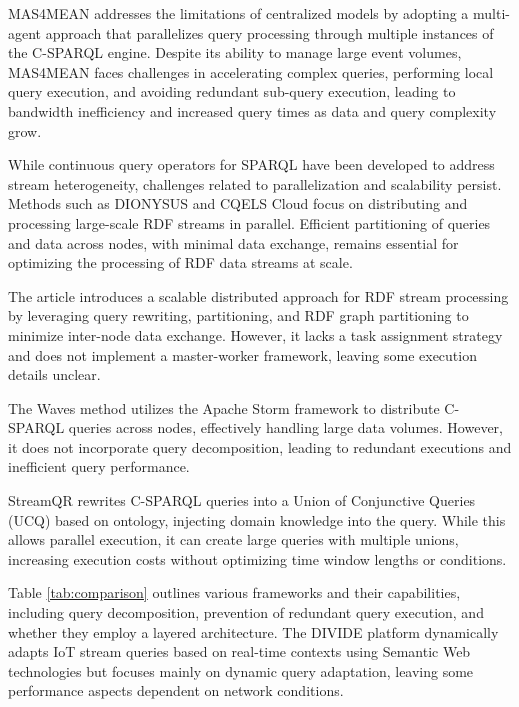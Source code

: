 \documentclass[5p,times]{elsarticle}
\begin{document}
MAS4MEAN \cite{mebrek2020stream} addresses the limitations of centralized models by adopting a multi-agent approach that parallelizes query processing 
through multiple instances of the C-SPARQL engine.
Despite its ability to manage large event volumes,
   MAS4MEAN faces challenges in accelerating complex queries, performing local query execution,
    and avoiding redundant sub-query execution, leading to bandwidth inefficiency and increased query times as data and query complexity grow.

While continuous query operators for SPARQL 
have been developed to address stream heterogeneity, challenges related to parallelization and scalability persist.
 Methods such as DIONYSUS \cite{gillani2016dionysus} and CQELS Cloud \cite{le2013elastic} focus on distributing and processing large-scale RDF
  streams in parallel. Efficient partitioning of queries and data across nodes, with minimal data exchange, remains essential for
   optimizing the processing of RDF data streams at scale.



The article \cite{dia2018drss} introduces a scalable distributed approach for RDF stream processing by
 leveraging query rewriting, partitioning, and RDF graph partitioning to minimize inter-node data exchange.
  However, it lacks a task assignment strategy and does not implement a master-worker framework, leaving some execution details unclear.

The Waves method \cite{khrouf2016waves} utilizes the Apache Storm framework to distribute C-SPARQL
 queries across nodes, effectively handling large data volumes. However, it does not incorporate query 
 decomposition, leading to redundant executions and inefficient query performance.

StreamQR \cite{calbimonte2016query} rewrites C-SPARQL queries into a Union of Conjunctive Queries (UCQ)
 based on ontology, injecting domain knowledge into the query. While this allows parallel execution, 
 it can create large queries with multiple unions, increasing execution costs without optimizing time window lengths or conditions.

Table \ref{tab:comparison} outlines various frameworks and their capabilities, including query decomposition, 
prevention of redundant query execution, and whether they employ a layered architecture.
 The DIVIDE platform \cite{de2024enabling} dynamically adapts IoT stream queries based on real-time contexts
  using Semantic Web technologies but focuses mainly on dynamic query adaptation, leaving some performance aspects dependent on network conditions.
\end{document}
